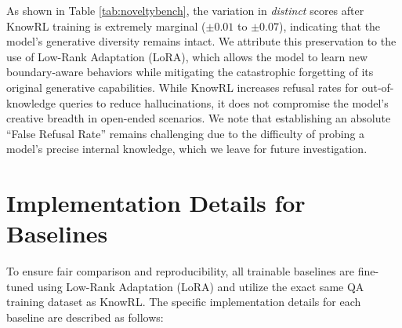 As shown in Table \ref{tab:noveltybench}, the variation in \textit{distinct} scores after KnowRL training is extremely marginal ($\pm 0.01$ to $\pm 0.07$), indicating that the model's generative diversity remains intact. We attribute this preservation to the use of Low-Rank Adaptation (LoRA), which allows the model to learn new boundary-aware behaviors while mitigating the catastrophic forgetting of its original generative capabilities. While KnowRL increases refusal rates for out-of-knowledge queries to reduce hallucinations, it does not compromise the model's creative breadth in open-ended scenarios. We note that establishing an absolute ``False Refusal Rate'' remains challenging due to the difficulty of probing a model's precise internal knowledge, which we leave for future investigation.






\section{Implementation Details for Baselines}
\label{app:baseline_details}

To ensure fair comparison and reproducibility, all trainable baselines are fine-tuned using Low-Rank Adaptation (LoRA) and utilize the exact same QA training dataset as KnowRL.
The specific implementation details for each baseline are described as follows:

